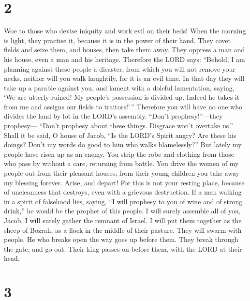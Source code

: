 \hypertarget{section-1}{%
\section{2}\label{section-1}}

 Woe to those who devise iniquity and work evil on their
beds! When the morning is light, they practise it, because it is in the
power of their hand.  They covet fields and seize them,
and houses, then take them away. They oppress a man and his house, even
a man and his heritage.  Therefore the LORD says:
``Behold, I am planning against these people a disaster, from which you
will not remove your necks, neither will you walk haughtily, for it is
an evil time.  In that day they will take up a parable
against you, and lament with a doleful lamentation, saying, `We are
utterly ruined! My people's possession is divided up. Indeed he takes it
from me and assigns our fields to traitors!'\,'' 
Therefore you will have no one who divides the land by lot in the LORD's
assembly.  ``Don't prophesy!''---they prophesy--- ``Don't
prophesy about these things. Disgrace won't overtake us.''
 Shall it be said, O house of Jacob, ``Is the LORD's
Spirit angry? Are these his doings? Don't my words do good to him who
walks blamelessly?''  But lately my people have risen up
as an enemy. You strip the robe and clothing from those who pass by
without a care, returning from battle.  You drive the
women of my people out from their pleasant houses; from their young
children you take away my blessing forever.  Arise, and
depart! For this is not your resting place, because of uncleanness that
destroys, even with a grievous destruction.  If a man
walking in a spirit of falsehood lies, saying, ``I will prophesy to you
of wine and of strong drink,'' he would be the prophet of this people.
 I will surely assemble all of you, Jacob. I will surely
gather the remnant of Israel. I will put them together as the sheep of
Bozrah, as a flock in the middle of their pasture. They will swarm with
people.  He who breaks open the way goes up before them.
They break through the gate, and go out. Their king passes on before
them, with the LORD at their head.

\hypertarget{section-2}{%
\section{3}\label{section-2}}

